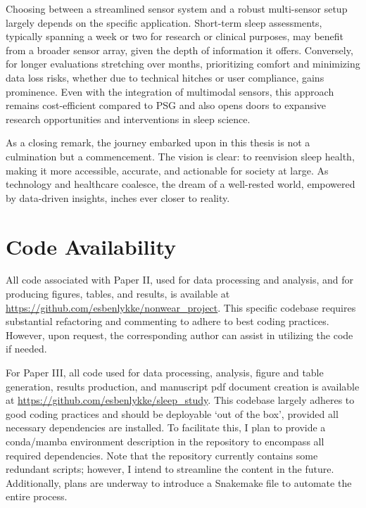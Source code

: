 \documentclass[
  10pt,
]{scrbook}
\begin{document}
Choosing between a streamlined sensor system and a robust multi-sensor
setup largely depends on the specific application. Short-term sleep
assessments, typically spanning a week or two for research or clinical
purposes, may benefit from a broader sensor array, given the depth of
information it offers. Conversely, for longer evaluations stretching
over months, prioritizing comfort and minimizing data loss risks,
whether due to technical hitches or user compliance, gains prominence.
Even with the integration of multimodal sensors, this approach remains
cost-efficient compared to PSG and also opens doors to expansive
research opportunities and interventions in sleep science.

As a closing remark, the journey embarked upon in this thesis is not a
culmination but a commencement. The vision is clear: to reenvision sleep
health, making it more accessible, accurate, and actionable for society
at large. As technology and healthcare coalesce, the dream of a
well-rested world, empowered by data-driven insights, inches ever closer
to reality.

\hypertarget{code-availability}{%
\chapter{Code Availability}\label{code-availability}}

All code associated with Paper II, used for data processing and
analysis, and for producing figures, tables, and results, is available
at \url{https://github.com/esbenlykke/nonwear_project}. This specific
codebase requires substantial refactoring and commenting to adhere to
best coding practices. However, upon request, the corresponding author
can assist in utilizing the code if needed.

For Paper III, all code used for data processing, analysis, figure and
table generation, results production, and manuscript pdf document
creation is available at
\url{https://github.com/esbenlykke/sleep_study}. This codebase largely
adheres to good coding practices and should be deployable `out of the
box', provided all necessary dependencies are installed. To facilitate
this, I plan to provide a conda/mamba environment description in the
repository to encompass all required dependencies. Note that the
repository currently contains some redundant scripts; however, I intend
to streamline the content in the future. Additionally, plans are
underway to introduce a Snakemake file to automate the entire process.
\end{document}

